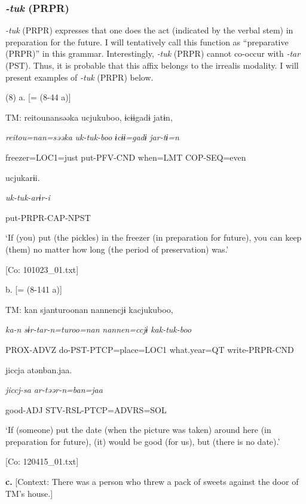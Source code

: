 \subsubsection{\textit{{}-tuk} (PRPR)}

\textit{{}-tuk} (PRPR) expresses that one does the act (indicated by the verbal stem) in preparation for the future. I will tentatively call this function as “preparative (PRPR)” in this grammar. Interestingly, \textit{{}-tuk} (PRPR) cannot co-occur with \textit{{}-tar} (PST). Thus, it is probable that this affix belongs to the irrealis modality. I will present examples of \textit{{}-tuk} (PRPR) below.

(8)  a.  [= (8-44 a)]

    TM:  {\textbar}reitou{\textbar}nansəəka  ucjukuboo,  ɨcɨɨgadɨ  jatɨn,

      \textit{reitou=nan=səəka}  \textit{uk-tuk-boo}  \textit{ɨcɨɨ=gadɨ}  \textit{jar-tɨ=n}

      freezer=LOC1=just  put-PFV-CND  when=LMT  COP-SEQ=even

      ucjukarɨi.

      \textit{uk-tuk{}-arɨr-i}

      put-PRPR-CAP-NPST

      ‘If (you) put (the pickles) in the freezer (in preparation for future), you can keep (them) no matter how long (the period of preservation) was.’

      [Co: 101023\_01.txt]

  b.  [= (8-141 a)]

    TM:  kan  sjanturoonan  {\textbar}nannen{\textbar}cjɨ  kacjukuboo,

      \textit{ka-n}  \textit{sɨr-tar-n=turoo=nan}  \textit{nannen=ccjɨ}  \textit{kak-tuk{}-boo}

      PROX-ADVZ  do-PST-PTCP=place=LOC1  what.year=QT  write-PRPR-CND

      jiccja  atənban.jaa.  

      \textit{jiccj-sa}  \textit{ar-təər-n=ban=jaa}  

      good-ADJ  STV-RSL-PTCP=ADVRS=SOL  

      ‘If (someone) put the date (when the picture was taken) around here (in preparation for future), (it) would be good (for us), but (there is no date).’

      [Co: 120415\_01.txt]

  \textbf{c.}  [Context: There was a person who threw a pack of sweets against the door of TM’s house.]

